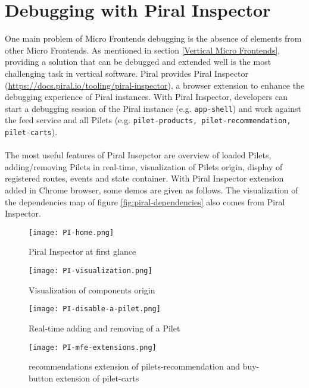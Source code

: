 \documentclass[a4paper]{book}
\begin{document}
\section{Debugging with Piral Inspector}
One main problem of Micro Frontends debugging is the absence of elements from other Micro Frontends.
As mentioned in section \ref{Vertical Micro Frontends}, providing a solution that can be debugged and extended well is the most challenging task in vertical software. Piral provides Piral Inspector (\url{https://docs.piral.io/tooling/piral-inspector}), a browser extension to enhance the debugging experience of Piral instances. With Piral Inspector, developers can start a debugging session of the Piral instance (e.g. \verb|app-shell|) and work against the feed service and all Pilets (e.g. \verb|pilet-products, pilet-recommendation, pilet-carts|). 
\\ \\
The most useful features of Piral Insepctor are overview of loaded Pilets, adding/removing Pilets in real-time, visualization of Pilets origin, display of registered routes, events and state container. With Piral Inspector extension added in Chrome browser, some demos are given as follows. The visualization of the dependencies map of figure \ref{fig:piral-dependencies} also comes from Piral Inspector.

\begin{figure}[h!]
  \centering
  \captionsetup{justification=centering}
  \texttt{[image: PI-home.png]}
  \caption{Piral Inspector at first glance}
  \label{fig:PI-hom}
\end{figure}

\begin{figure}[h!]
  \centering
  \captionsetup{justification=centering}
  \texttt{[image: PI-visualization.png]}
  \caption{Visualization of components origin}
  \label{fig:PI-visualization}
\end{figure}

\begin{figure}[h!]
  \centering
  \captionsetup{justification=centering}
  \texttt{[image: PI-disable-a-pilet.png]}
  \caption{Real-time adding and removing of a Pilet}
  \label{fig:PI-disable-a-pilet}
\end{figure}

\begin{figure}[h!]
  \centering
  \captionsetup{justification=centering}
  \texttt{[image: PI-mfe-extensions.png]}
  \caption{recommendations extension of pilets-recommendation and buy-button extension of pilet-carts}
  \label{fig:PI-mfe}
\end{figure}
\end{document}
